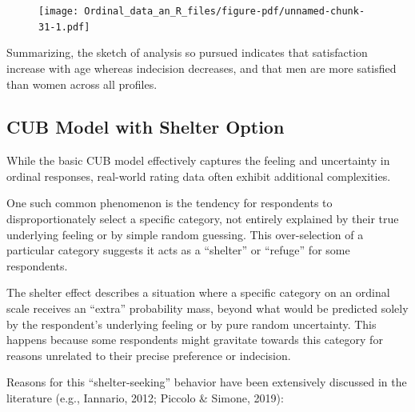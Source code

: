 \documentclass[
  letterpaper,
  DIV=11,
  numbers=noendperiod]{scrartcl}
\begin{document}
\begin{figure}[H]

{\centering \texttt{[image: Ordinal\_data\_an\_R\_files/figure-pdf/unnamed-chunk-31-1.pdf]}

}

\end{figure}

Summarizing, the sketch of analysis so pursued indicates that
satisfaction increase with age whereas indecision decreases, and that
men are more satisfied than women across all profiles.

\hypertarget{cub-model-with-shelter-option}{%
\subsection{CUB Model with Shelter
Option}\label{cub-model-with-shelter-option}}

While the basic CUB model effectively captures the feeling and
uncertainty in ordinal responses, real-world rating data often exhibit
additional complexities.

One such common phenomenon is the tendency for respondents to
disproportionately select a specific category, not entirely explained by
their true underlying feeling or by simple random guessing. This
over-selection of a particular category suggests it acts as a
``shelter'' or ``refuge'' for some respondents.

The shelter effect describes a situation where a specific category on an
ordinal scale receives an ``extra'' probability mass, beyond what would
be predicted solely by the respondent's underlying feeling or by pure
random uncertainty. This happens because some respondents might
gravitate towards this category for reasons unrelated to their precise
preference or indecision.

Reasons for this ``shelter-seeking'' behavior have been extensively
discussed in the literature (e.g., Iannario, 2012; Piccolo \& Simone,
2019):
\end{document}
